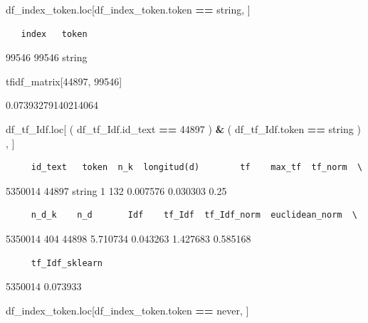 \documentclass[
  11pt,
  a4paper,
]{article}
\newenvironment{Shaded}{\begin{snugshade}}{\end{snugshade}}
\newcommand{\DecValTok}[1]{\textcolor[rgb]{0.00,0.00,0.81}{#1}}
\newcommand{\NormalTok}[1]{#1}
\newcommand{\OperatorTok}[1]{\textcolor[rgb]{0.81,0.36,0.00}{\textbf{#1}}}
\newcommand{\StringTok}[1]{\textcolor[rgb]{0.31,0.60,0.02}{#1}}
\begin{document}
\begin{Shaded}
\begin{Highlighting}[]
\NormalTok{df\_index\_token.loc[df\_index\_token.token }\OperatorTok{==} \StringTok{\textquotesingle{}string\textquotesingle{}}\NormalTok{, ]}
\end{Highlighting}
\end{Shaded}

\begin{verbatim}
   index   token
\end{verbatim}

99546 99546 string

\begin{Shaded}
\begin{Highlighting}[]
\NormalTok{tfidf\_matrix[}\DecValTok{44897}\NormalTok{, }\DecValTok{99546}\NormalTok{]}
\end{Highlighting}
\end{Shaded}

0.07393279140214064

\begin{Shaded}
\begin{Highlighting}[]
\NormalTok{df\_tf\_Idf.loc[ ( df\_tf\_Idf.id\_text }\OperatorTok{==} \DecValTok{44897}\NormalTok{ ) }\OperatorTok{\&}\NormalTok{  ( df\_tf\_Idf.token }\OperatorTok{==} \StringTok{\textquotesingle{}string\textquotesingle{}}\NormalTok{ ) , ]}
\end{Highlighting}
\end{Shaded}

\begin{verbatim}
     id_text   token  n_k  longitud(d)        tf    max_tf  tf_norm  \
\end{verbatim}

5350014 44897 string 1 132 0.007576 0.030303 0.25

\begin{verbatim}
     n_d_k    n_d       Idf    tf_Idf  tf_Idf_norm  euclidean_norm  \
\end{verbatim}

5350014 404 44898 5.710734 0.043263 1.427683 0.585168

\begin{verbatim}
     tf_Idf_sklearn  
\end{verbatim}

5350014 0.073933

\begin{Shaded}
\begin{Highlighting}[]
\NormalTok{df\_index\_token.loc[df\_index\_token.token }\OperatorTok{==} \StringTok{\textquotesingle{}never\textquotesingle{}}\NormalTok{, ]}
\end{Highlighting}
\end{Shaded}
\end{document}
